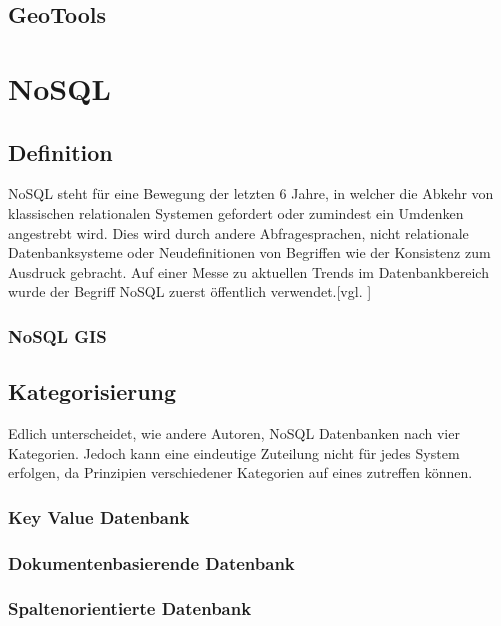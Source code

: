 \subsection{GeoTools}



\section{NoSQL}

\subsection{Definition}

NoSQL steht für eine Bewegung der letzten 6 Jahre, in welcher die Abkehr von klassischen relationalen Systemen gefordert oder zumindest ein Umdenken angestrebt wird.
Dies wird durch andere Abfragesprachen, nicht relationale Datenbanksysteme oder Neudefinitionen von Begriffen wie der Konsistenz zum Ausdruck gebracht.
Auf einer Messe zu aktuellen Trends im Datenbankbereich wurde der Begriff NoSQL zuerst öffentlich verwendet.[vgl. ]

\subsubsection{NoSQL GIS}


\subsection{Kategorisierung}
Edlich unterscheidet, wie andere Autoren, NoSQL Datenbanken nach vier Kategorien.
Jedoch kann eine eindeutige Zuteilung nicht für jedes System erfolgen, da Prinzipien verschiedener Kategorien auf eines zutreffen können.


\subsubsection{Key Value Datenbank}



\subsubsection{Dokumentenbasierende Datenbank}

\subsubsection{Spaltenorientierte Datenbank}

